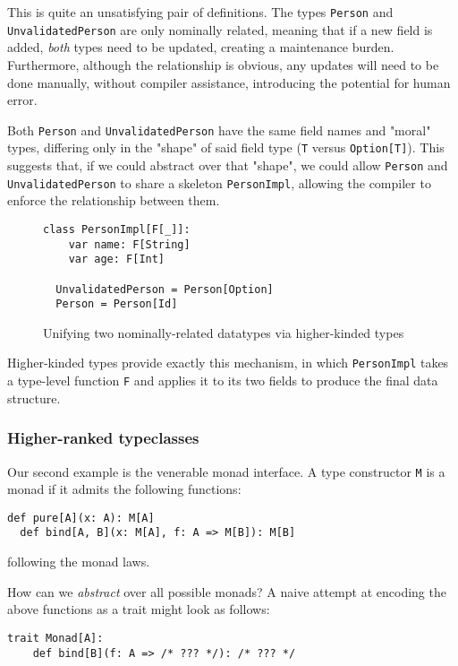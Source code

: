 \documentclass[acmsmall,screen]{acmart}
\begin{document}
This is quite an unsatisfying pair of definitions. The types \texttt{Person}
and \texttt{UnvalidatedPerson} are only nominally related, meaning that if a
new field is added, \emph{both} types need to be updated, creating a
maintenance burden. Furthermore, although the relationship is obvious, any
updates will need to be done manually, without compiler assistance, introducing
the potential for human error.

Both \texttt{Person} and \texttt{UnvalidatedPerson} have the same field
names and "moral" types, differing only in the "shape" of said field type
(\texttt{T} versus \texttt{Option[T]}). This suggests that, if we could
abstract over that "shape", we could allow \texttt{Person} and
\texttt{UnvalidatedPerson} to share a skeleton \texttt{PersonImpl},
allowing the compiler to enforce the relationship between them.

\begin{figure}[ht]
  \begin{lstlisting}[style=scala]
  class PersonImpl[F[_]]:
    var name: F[String]
    var age: F[Int]

  UnvalidatedPerson = Person[Option]
  Person = Person[Id]
  \end{lstlisting}
  \caption{Unifying two nominally-related datatypes via higher-kinded
  types}
\end{figure}

Higher-kinded types provide exactly this mechanism, in which
\texttt{PersonImpl} takes a type-level function \texttt{F} and applies it to
its two fields to produce the final data structure.

\subsubsection*{Higher-ranked typeclasses}

Our second example is the venerable monad interface. A type constructor
\texttt{M} is a monad if it admits the following functions:
\begin{lstlisting}[style=scala]
  def pure[A](x: A): M[A]
  def bind[A, B](x: M[A], f: A => M[B]): M[B]
\end{lstlisting}
following the monad laws.

How can we \emph{abstract} over all possible monads? A naive attempt at
encoding the above functions as a trait might look as follows:
\begin{lstlisting}[style=scala]
  trait Monad[A]:
    def bind[B](f: A => /* ??? */): /* ??? */
\end{lstlisting}
\end{document}
